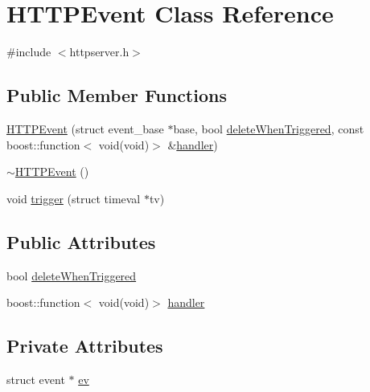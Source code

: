 \hypertarget{class_h_t_t_p_event}{}\section{H\+T\+T\+P\+Event Class Reference}
\label{class_h_t_t_p_event}


{\ttfamily \#include $<$httpserver.\+h$>$}

\subsection*{Public Member Functions}
\begin{DoxyCompactItemize}
\item 
\mbox{\hyperlink{class_h_t_t_p_event_ad7598146077dac606ccf4c9948040508}{H\+T\+T\+P\+Event}} (struct event\+\_\+base $\ast$base, bool \mbox{\hyperlink{class_h_t_t_p_event_a226496f0af00e98c301e92cd8bf7ca9b}{delete\+When\+Triggered}}, const boost\+::function$<$ void(void)$>$ \&\mbox{\hyperlink{class_h_t_t_p_event_a61e7b99b180ddd304a524c2a27063c4c}{handler}})
\item 
\mbox{\hyperlink{class_h_t_t_p_event_a3f216c67f9c4732bac686744a9c527d7}{$\sim$\+H\+T\+T\+P\+Event}} ()
\item 
void \mbox{\hyperlink{class_h_t_t_p_event_ad3e2ab005035c3ac678b29095ac0da87}{trigger}} (struct timeval $\ast$tv)
\end{DoxyCompactItemize}
\subsection*{Public Attributes}
\begin{DoxyCompactItemize}
\item 
bool \mbox{\hyperlink{class_h_t_t_p_event_a226496f0af00e98c301e92cd8bf7ca9b}{delete\+When\+Triggered}}
\item 
boost\+::function$<$ void(void)$>$ \mbox{\hyperlink{class_h_t_t_p_event_a61e7b99b180ddd304a524c2a27063c4c}{handler}}
\end{DoxyCompactItemize}
\subsection*{Private Attributes}
\begin{DoxyCompactItemize}
\item 
struct event $\ast$ \mbox{\hyperlink{class_h_t_t_p_event_a1b00e03074314686bf8b01979f938a45}{ev}}
\end{DoxyCompactItemize}


